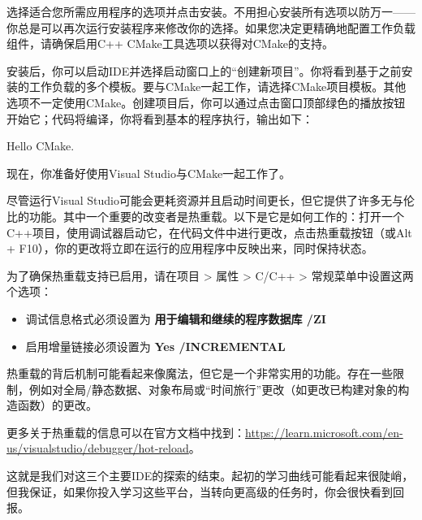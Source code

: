 选择适合您所需应用程序的选项并点击安装。不用担心安装所有选项以防万一——你总是可以再次运行安装程序来修改你的选择。如果您决定更精确地配置工作负载组件，请确保启用C++ CMake工具选项以获得对CMake的支持。

安装后，你可以启动IDE并选择启动窗口上的“创建新项目”。你将看到基于之前安装的工作负载的多个模板。要与CMake一起工作，请选择CMake项目模板。其他选项不一定使用CMake。创建项目后，你可以通过点击窗口顶部绿色的播放按钮开始它；代码将编译，你将看到基本的程序执行，输出如下：

\begin{cmake}
Hello CMake.
\end{cmake}

现在，你准备好使用Visual Studio与CMake一起工作了。


尽管运行Visual Studio可能会更耗资源并且启动时间更长，但它提供了许多无与伦比的功能。其中一个重要的改变者是热重载。以下是它是如何工作的：打开一个C++项目，使用调试器启动它，在代码文件中进行更改，点击热重载按钮（或Alt + F10），你的更改将立即在运行的应用程序中反映出来，同时保持状态。

为了确保热重载支持已启用，请在项目 > 属性 > C/C++ > 常规菜单中设置这两个选项：

\begin{itemize}
\item
调试信息格式必须设置为 \textbf{用于编辑和继续的程序数据库 /ZI}

\item
启用增量链接必须设置为 \textbf{Yes /INCREMENTAL}
\end{itemize}

热重载的背后机制可能看起来像魔法，但它是一个非常实用的功能。存在一些限制，例如对全局/静态数据、对象布局或“时间旅行”更改（如更改已构建对象的构造函数）的更改。

更多关于热重载的信息可以在官方文档中找到：\url{https://learn.microsoft.com/en-us/visualstudio/debugger/hot-reload}。

这就是我们对这三个主要IDE的探索的结束。起初的学习曲线可能看起来很陡峭，但我保证，如果你投入学习这些平台，当转向更高级的任务时，你会很快看到回报。















